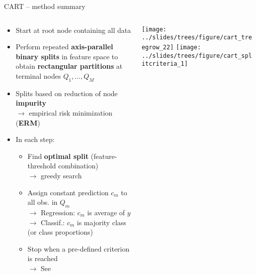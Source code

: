 \begin{frame}{CART -- method summary}

\footnotesize

 
  

\medskip

\begin{columns}[T, totalwidth=\textwidth]
\begin{column}{0.6\textwidth}
\begin{itemize}
  \item Start at root node containing all data
  \item Perform repeated \textbf{axis-parallel binary splits} in feature space to obtain
  \textbf{rectangular partitions} at terminal nodes $Q_1, \dots, Q_M$
  \item Splits based on reduction of node \textbf{impurity} \\
  $\rightarrow$ empirical risk minimization (\textbf{ERM})
  \item In each step:
  \begin{itemize}
    \item Find \textbf{optimal split} (feature-threshold combination) \\
    $\rightarrow$ greedy search
    \item Assign constant prediction $c_m$ to all obs. in $Q_m$\\
    $\rightarrow$ Regression: $c_m$ is average of $y$ \\
    $\rightarrow$ Classif.: $c_m$ is majority class (or class proportions)
    
  \item Stop when a pre-defined criterion is reached\\
  $\rightarrow$ See 
  \end{itemize}
\end{itemize}

\end{column}
\begin{column}{0.45\textwidth}
\texttt{[image: ../slides/trees/figure/cart\_treegrow\_22]}
\texttt{[image:    ../slides/trees/figure/cart\_splitcriteria\_1]} 
\end{column}
\end{columns}


\end{frame}
